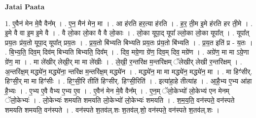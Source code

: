 \documentclass[17pt]{extarticle}
\begin{document}
\textbf{Jatai Paata} \newline

1. ए॒वैन॑ मेन मे॒वै वैन᳚म् । . ए॒न॒ मैन॑ मेन॒ मा । . आ ह॑रति हर॒त्या ह॑रति । . ह॒र॒ ती॒म इ॒मे ह॑रति हर ती॒मे । . इ॒मे वै वा इ॒म इ॒मे वै । . वै लो॒का लो॒का वै वै लो॒काः । . लो॒का यूपा॒द् यूपा᳚ ल्लो॒का लो॒का यूपा᳚त् । . यूपा᳚त् प्रय॒तः प्र॑य॒तो यूपा॒द् यूपा᳚त् प्रय॒तः । . प्र॒य॒तो बि॑भ्यति बिभ्यति प्रय॒तः प्र॑य॒तो बि॑भ्यति । . प्र॒य॒त इति॑ प्र - य॒तः । . बि॒भ्य॒ति॒ दिव॒म् दिव॑म् बिभ्यति बिभ्यति॒ दिव᳚म् । . दिव॒ मग्रे॒णा ग्रे॑ण॒ दिव॒म् दिव॒ मग्रे॑ण । . अग्रे॑ण॒ मा मा ऽग्रे॒णा ग्रे॑ण॒ मा । . मा ले॑खीर् लेखी॒र् मा मा ले॑खीः । . ले॒खी॒ र॒न्तरि॑क्ष म॒न्तरि॑क्षम् ॅलेखीर् लेखी र॒न्तरि॑क्षम् । . अ॒न्तरि॑क्ष॒म् मद्ध्ये॑न॒ मद्ध्ये॑ना॒ न्तरि॑क्ष म॒न्तरि॑क्ष॒म् मद्ध्ये॑न । . मद्ध्ये॑न॒ मा मा मद्ध्ये॑न॒ मद्ध्ये॑न॒ मा । . मा हिꣳ॑सीर्. हिꣳसी॒र् मा मा हिꣳ॑सीः । . हिꣳ॒॒सी॒रि तीति॑ हिꣳसीर्. हिꣳसी॒रिति॑ । . इत्या॑हा॒हे तीत्या॑ह । . आ॒है॒भ्य ए॒भ्य आ॑हा है॒भ्यः । . ए॒भ्य ए॒वै वैभ्य ए॒भ्य ए॒व । . ए॒वैन॑ मेन मे॒वै वैन᳚म् । . ए॒न॒म् ॅलो॒केभ्यो॑ लो॒केभ्य॑ एन मेनम् ॅलो॒केभ्यः॑ । . लो॒केभ्यः॑ शमयति शमयति लो॒केभ्यो॑ लो॒केभ्यः॑ शमयति । . श॒म॒य॒ति॒ वन॑स्पते॒ वन॑स्पते शमयति शमयति॒ वन॑स्पते । . वन॑स्पते श॒तव॑ल्.शः श॒तव॑ल्.शो॒ वन॑स्पते॒ वन॑स्पते श॒तव॑ल्.शः । \newline
\end{document}
